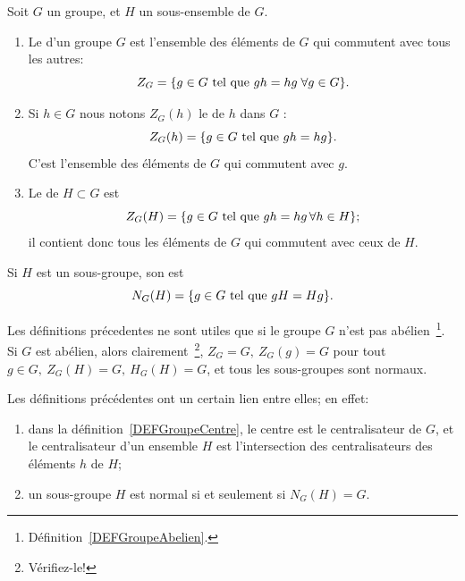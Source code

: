 \begin{definition}\label{defGroupeCentre}
Soit \( G\) un groupe, et \( H\) un sous-ensemble de \( G \).
\begin{enumerate}
\item
Le  d'un groupe \( G\) est l'ensemble des éléments de \( G\) qui commutent avec tous les autres:
\begin{equation}
    Z_G=\{ g\in G\text{ tel que } gh=hg\;\forall g\in G \}.
\end{equation}

\item
Si \( h\in G\) nous notons \( Z_G(h)\) le  de \( h\) dans \( G\) :
\begin{equation}
    Z_G(h)=\{g\in G\text{ tel que } gh = hg\}.
\end{equation}
C'est l'ensemble des éléments de \( G\) qui commutent avec \( g\).

\item    Le  de \( H\subset G\) est
    \begin{equation}
        Z_G(H)=\{ g\in G\text{ tel que } gh=hg\,\forall h\in H\};
    \end{equation}
    il contient donc tous les éléments de \( G\) qui commutent avec ceux de \( H\).
\end{enumerate}
\end{definition}

\begin{definition}\label{DEFGroupeNormalisateur}
        Si \( H\) est un sous-groupe, son  est
    \begin{equation}
        N_G(H)=\{ g\in G\text{ tel que } gH=Hg \}.
    \end{equation}
\end{definition}

\begin{remark}
Les définitions précedentes ne sont utiles que si le groupe \(G \) n'est pas abélien~\footnote{Définition~\ref{DEFGroupeAbelien}.}. Si \( G \) est abélien, alors clairement~\footnote{Vérifiez-le!}, \(Z_G = G,\ Z_G(g) = G\) pour tout \(g \in G,\ Z_G(H) = G,\ H_G(H) = G\), et tous les sous-groupes sont normaux.
\end{remark}

\begin{remark}
Les définitions précédentes ont un certain lien entre elles; en effet:
  \begin{enumerate}
    \item dans la définition~\ref{DEFGroupeCentre}, le centre est le centralisateur de \(G \), et le centralisateur d'un ensemble \( H \) est l'intersection des centralisateurs des éléments \( h \) de \( H \);
    \item un sous-groupe \( H \) est normal si et seulement si \( N_G(H) = G \).
  \end{enumerate}
\end{remark}


